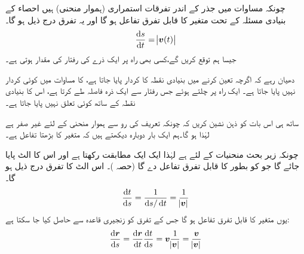 چونکہ مساوات  میں جذر کے اندر تفرقات  استمراری   (ہموار منحنی)  ہیں احصاء کے بنیادی مسئلہ کے تحت  متغیر  کا قابل تفرق تفاعل ہو گا     اور یہ تفرق درج ذیل ہو گا۔
\begin{align}\label{مساوات_سمتی_تفاعل_لمبائی_قوس_ٹ}
\frac{\dif s}{\dif t}=\abs{\kvec{v}(t)}
\end{align}
جیسا ہم توقع  کریں گے،کسی بھی راہ پر  ایک ذرے کی رفتار  کی مقدار ہوتی ہے۔ 

 دھیان رہے کہ اگرچہ  تعین کرنے میں بنیادی نقطہ  کا کردار پایا جاتا ہے،    کا مساوات  میں کوئی کردار نہیں پایا جاتا ہے۔ ایک راہ پر چلتے ہوئے جس رفتار سے ایک  ذرہ فاصلہ طے کرتا ہے، اس کا  بنیادی نقطہ  کے ساتھ کوئی تعلق نہیں پایا جاتا ہے۔

ساتھ ہی اس بات کو ذہن نشین کریں کہ چونکہ تعریف کی رو سے ہموار منحنی کے لئے   غیر صفر   ہے لہٰذا  ہو گا۔ہم ایک بار دوبارہ دیکھتے ہیں کہ  متغیر  کا بڑھتا تفاعل ہے۔

چونکہ زیر بحث منحنیات کے لئے  ہے  لہٰذا  ایک ایک مطابقت رکھتا ہے اور اس کا الٹ پایا جائے گا جو   کو بطور  کا قابل تفرق تفاعل دے گا (حصہ )۔ اس الٹ کا تفرق درج ذیل ہو گا۔
\begin{align}\label{مساوات_سمتی_تفاعل_لمبائی_قوس_ث}
\frac{\dif t}{\dif s}=\frac{1}{\dif s/\dif t}=\frac{1}{\abs{\kvec{v}}}
\end{align}
یوں  متغیر  کا قابل تفرق تفاعل ہو گا جس کے تفرق کو زنجیری قاعدہ سے حاصل کیا جا سکتا ہے:
\begin{align}\label{مساوات_سمتی_تفاعل_لمبائی_قوس_ج}
\frac{\dif \kvec{r}}{\dif s}=\frac{\dif \kvec{r}}{\dif t}\frac{\dif t}{\dif s}=\kvec{v}\frac{1}{\abs{\kvec{v}}}=\frac{\kvec{v}}{\abs{\kvec{v}}}
\end{align}

